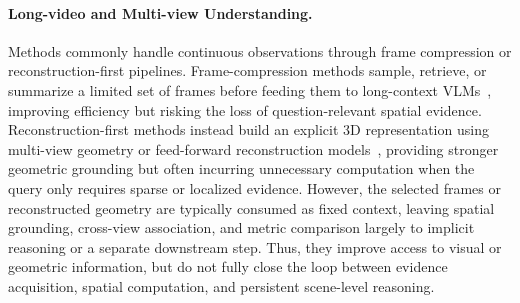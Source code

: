\documentclass{llmxive}
\begin{document}
\paragraph{Long-video and Multi-view Understanding.}
Methods commonly handle continuous observations through frame compression or reconstruction-first pipelines. 
Frame-compression methods sample, retrieve, or summarize a limited set of frames before feeding them to long-context VLMs~\citep{videollama,longva,tstar}, improving efficiency but risking the loss of question-relevant spatial evidence. 
Reconstruction-first methods instead build an explicit 3D representation using multi-view geometry or feed-forward reconstruction models~\citep{vggt,da3}, providing stronger geometric grounding but often incurring unnecessary computation when the query only requires sparse or localized evidence. 
However, the selected frames or reconstructed geometry are typically consumed as fixed context, leaving spatial grounding, cross-view association, and metric comparison largely to implicit reasoning or a separate downstream step. 
Thus, they improve access to visual or geometric information, but do not fully close the loop between evidence acquisition, spatial computation, and persistent scene-level reasoning.





\end{document}
